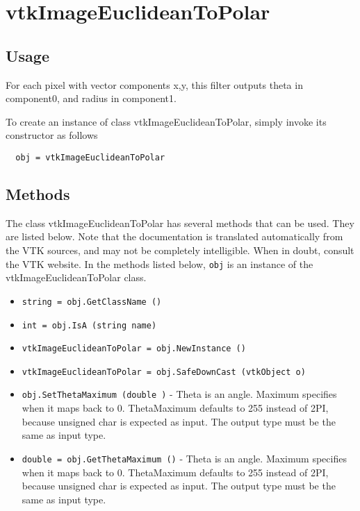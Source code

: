 \section{vtkImageEuclideanToPolar}

\subsection{Usage}

 For each pixel with vector components x,y, this filter outputs 
 theta in component0, and radius in component1.

To create an instance of class vtkImageEuclideanToPolar, simply
invoke its constructor as follows
\begin{verbatim}
  obj = vtkImageEuclideanToPolar
\end{verbatim}
\subsection{Methods}

The class vtkImageEuclideanToPolar has several methods that can be used.
  They are listed below.
Note that the documentation is translated automatically from the VTK sources,
and may not be completely intelligible.  When in doubt, consult the VTK website.
In the methods listed below, \verb|obj| is an instance of the vtkImageEuclideanToPolar class.
\begin{itemize}
\item  \verb|string = obj.GetClassName ()|

\item  \verb|int = obj.IsA (string name)|

\item  \verb|vtkImageEuclideanToPolar = obj.NewInstance ()|

\item  \verb|vtkImageEuclideanToPolar = obj.SafeDownCast (vtkObject o)|

\item  \verb|obj.SetThetaMaximum (double )| -  Theta is an angle. Maximum specifies when it maps back to 0.
 ThetaMaximum defaults to 255 instead of 2PI, because unsigned char
 is expected as input. The output type must be the same as input type.

\item  \verb|double = obj.GetThetaMaximum ()| -  Theta is an angle. Maximum specifies when it maps back to 0.
 ThetaMaximum defaults to 255 instead of 2PI, because unsigned char
 is expected as input. The output type must be the same as input type.

\end{itemize}
